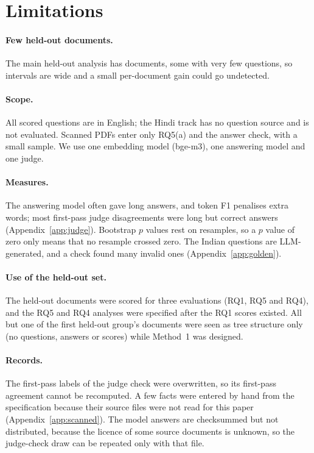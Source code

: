 \section*{Limitations}

\paragraph{Few held-out documents.} The main held-out analysis has
\AccountingMain{} documents, some with very few questions, so intervals
are wide and a small per-document gain could go undetected.

\paragraph{Scope.} All scored questions are in English; the Hindi track
has no question source and is not evaluated. Scanned PDFs enter only
RQ5(a) and the answer check, with a small sample. We use one embedding
model (bge-m3), one answering model and one judge.

\paragraph{Measures.} The answering model often gave long answers, and
token F1 penalises extra words; most first-pass judge disagreements were
long but correct answers (Appendix~\ref{app:judge}). Bootstrap $p$ values
rest on \Resamples{} resamples, so a $p$ value of zero only means that no
resample crossed zero. The Indian questions are LLM-generated, and a check
found many invalid ones (Appendix~\ref{app:golden}).

\paragraph{Use of the held-out set.} The held-out documents were scored
for three evaluations (RQ1, RQ5 and RQ4), and the RQ5 and RQ4 analyses
were specified after the RQ1 scores existed. All but one of the first
held-out group's documents were seen as tree structure only (no
questions, answers or scores) while Method~1 was designed.

\paragraph{Records.} The first-pass labels of the judge check were
overwritten, so its first-pass agreement cannot be recomputed. A few
facts were entered by hand from the specification because their source
files were not read for this paper (Appendix~\ref{app:scanned}). The
model answers are checksummed but not distributed, because the licence of
some source documents is unknown, so the judge-check draw can be repeated
only with that file.
